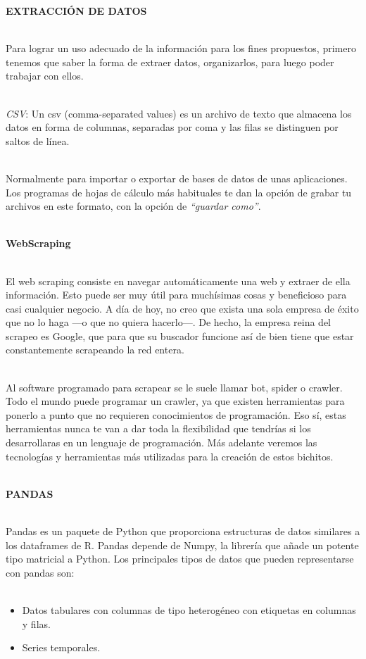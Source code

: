 \documentclass[conference,compsoc,onecolumn]{IEEEtran}
\begin{document}
\textbf{EXTRACCIÓN DE DATOS}
\\\

Para lograr un uso adecuado de la información para los fines propuestos, primero tenemos que saber la forma de extraer datos, organizarlos, para luego poder trabajar con ellos.
\\\

 \textsl{CSV}: Un csv (comma-separated values) es un archivo de texto que almacena los datos en forma de columnas, separadas por coma y las filas se distinguen por saltos de línea.
 \\\
 
 Normalmente para importar o exportar de bases de datos de unas aplicaciones. Los programas de hojas de cálculo más habituales te dan la opción de grabar tu archivos en este formato, con la opción de  \textsl{“guardar como”}.~\cite{8}
 \\\

\textbf{WebScraping}
\\\

El web scraping consiste en navegar automáticamente una web y extraer de ella información. Esto puede ser muy útil para muchísimas cosas y beneficioso para casi cualquier negocio. A día de hoy, no creo que exista una sola empresa de éxito que no lo haga —o que no quiera hacerlo—. De hecho, la empresa reina del scrapeo es Google, que para que su buscador funcione así de bien tiene que estar constantemente scrapeando la red entera.
\\\

Al software programado para scrapear se le suele llamar bot, spider o crawler. Todo el mundo puede programar un crawler, ya que existen herramientas para ponerlo a punto que no requieren conocimientos de programación. Eso sí, estas herramientas nunca te van a dar toda la flexibilidad que tendrías si los desarrollaras en un lenguaje de programación. Más adelante veremos las tecnologías y herramientas más utilizadas para la creación de estos bichitos.~\cite{9}
\\\

\textbf{PANDAS}
\\\

Pandas es un paquete de Python que proporciona estructuras de datos similares a los dataframes de R. Pandas depende de Numpy, la librería que añade un potente tipo matricial a Python. Los principales tipos de datos que pueden representarse con pandas son:
\\\

\begin{itemize}
\item Datos tabulares con columnas de tipo heterogéneo con etiquetas en columnas y filas.
\item Series temporales.~\cite{10}
\end{itemize}
\\\
\end{document}

